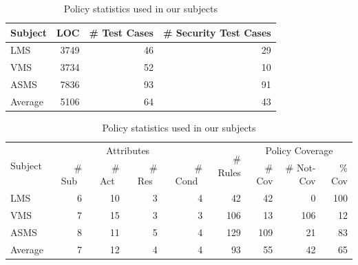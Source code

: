 \begin{table}[htbp]
  \centering
  	\caption{Subjects used in our evaluation}
  	\vspace{-8pt}    
    \begin{tabular}{|l|r|r|r|}
    \hline
    Subject & LOC & \# Test Cases & \# Security Test Cases \\\hline\hline
    LMS   & 3749  & 46    & 29     \\\hline
    VMS   & 3734  & 52    & 10     \\\hline
    ASMS  & 7836  & 93    & 91     \\\hline\hline
    Average & 5106  & 64    & 43     \\\hline
		\end{tabular}%
  \label{tab:subj}%
%

\vspace{+10pt}
\centering
  \caption{Policy statistics used in our subjects}
  	\vspace{-8pt}   
    \begin{tabular}{|l|r|r|r|r||r||r|r|r|}
 		\hline
 		     \multirow{2}{*}{Subject} & \multicolumn{4}{|c||}{Attributes} & \multirow{2}{*}{\# Rules} & \multicolumn{3}{|c|}{Policy Coverage}  \\\cline{2-5}\cline{7-9}
 		     
     & ~\# Sub~ & ~\# Act~ & ~\# Res~ & ~\# Cond~ & & \# Cov & \# Not-Cov& \% Cov \\\hline\hline
    LMS   & 6     & 10    & 3     & 4     & 42    & 42    & 0     & 100 \\\hline
    VMS   & 7     & 15    & 3     & 3     & 106   & 13    & 106   & 12 \\\hline
    ASMS~  & 8     & 11    & 5     & 4     & 129   & 109   & 21    & 83 \\\hline\hline
 		Average & 7     & 12    & 4     & 4     & 93    & 55    & 42    & 65 \\\hline

    \end{tabular}%
  \label{tab:subjectpolicies}%
\end{table}%

